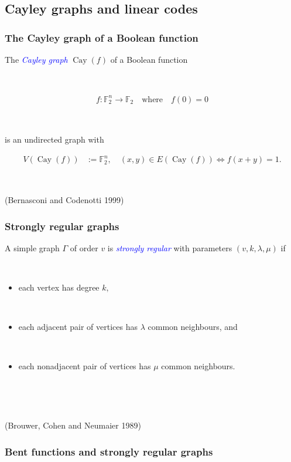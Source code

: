 \documentclass[pdf,sprung,slideColor,nocolorBG]{beamer}
\newenvironment{colortheme}[1]{
\def\ProvidesPackageRCS $##1${\relax}
\renewcommand{\ProcessOptions}{\relax}
\makeatletter

\makeatother
}{}
\newcommand{\slidecite}[1]{\tiny{(#1)}\normalsize{}}
\newcommand{\mb}[1]{\mathbb{#1}}
\newcommand{\Emph}[1]{\emph{\textcolor{blue}{#1}}}
\newcommand{\To}{\rightarrow}
\newcommand{\Cay}[1]{\operatorname{Cay}\left(#1\right)}
\newcommand{\F}{\mb{F}}
\begin{document}
\subsection{Cayley graphs and linear codes}

\begin{colortheme}{seagull}

\begin{frame}
\frametitle{The Cayley graph of a Boolean function}
The \Emph{Cayley graph} $\Cay{f}$ of a Boolean function

~

\begin{align*}
%
f : \F_2^n \To \F_2 \quad \text{where} \quad f(0) = 0
%
\end{align*}

~

is
an undirected graph with

\begin{align*}
V(\Cay{f}) &:= \F_2^n, \quad (x,y) \in E(\Cay{f}) \Leftrightarrow f(x+y) = 1.
\end{align*}

~

\slidecite{Bernasconi and Codenotti 1999}
\end{frame}

\begin{frame}
\frametitle{Strongly regular graphs}
A simple graph $\Gamma$ of order $v$ is \Emph{strongly regular} with parameters
$(v,k,\lambda,\mu)$ if

~

\begin{itemize}
 \item
each vertex has degree $k,$

~
 \item
each adjacent pair of vertices has $\lambda$ common neighbours, and

~
\item
each nonadjacent pair of vertices has $\mu$ common neighbours.
\end{itemize}

~

~

\slidecite{Brouwer, Cohen and Neumaier 1989}

\end{frame}

\begin{frame}
\frametitle{Bent functions and strongly regular graphs}


\end{frame}
\end{colortheme}
\end{document}
